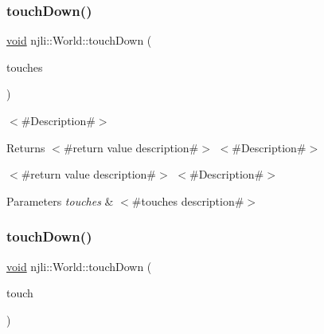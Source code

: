 \subsubsection{\texorpdfstring{touch\+Down()}{touchDown()}\hspace{0.1cm}{\footnotesize\ttfamily [1/2]}}
{\footnotesize\ttfamily \mbox{\hyperlink{_thread_8h_af1e856da2e658414cb2456cb6f7ebc66}{void}} njli\+::\+World\+::touch\+Down (\begin{DoxyParamCaption}\item[{\mbox{\hyperlink{classnjli_1_1_device_touch}{Device\+Touch}} $\ast$$\ast$}]{touches }\end{DoxyParamCaption})}

$<$\#\+Description\#$>$

\begin{DoxyReturn}{Returns}
$<$\#return value description\#$>$ $<$\#\+Description\#$>$

$<$\#return value description\#$>$ $<$\#\+Description\#$>$
\end{DoxyReturn}

\begin{DoxyParams}{Parameters}
{\em touches} & $<$\#touches description\#$>$ \\
\hline
\end{DoxyParams}
\mbox{\label{classnjli_1_1_world_aa1bc8ac0264f93580c6629d41dbd00b3}} 
\subsubsection{\texorpdfstring{touch\+Down()}{touchDown()}\hspace{0.1cm}{\footnotesize\ttfamily [2/2]}}
{\footnotesize\ttfamily \mbox{\hyperlink{_thread_8h_af1e856da2e658414cb2456cb6f7ebc66}{void}} njli\+::\+World\+::touch\+Down (\begin{DoxyParamCaption}\item[{const \mbox{\hyperlink{classnjli_1_1_device_touch}{Device\+Touch}} \&}]{touch }\end{DoxyParamCaption})}

\mbox{\label{classnjli_1_1_world_a19b6222b4d9eaa0f83ab74f555ed6e68}} 
